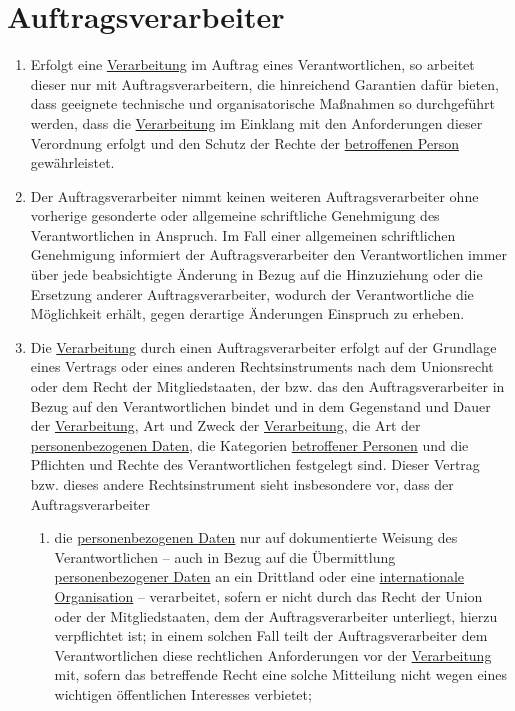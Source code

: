 \chapter{Auftragsverarbeiter}
\label{ch:28}


\begin{enumerate}

  \item Erfolgt eine \hyperref[itm:04-2]{Verarbeitung} im Auftrag eines Verantwortlichen, so arbeitet dieser nur mit Auftragsverarbeitern,
   die hinreichend Garantien dafür bieten, dass geeignete technische und organisatorische Maßnahmen so durchgeführt
   werden, dass die \hyperref[itm:04-2]{Verarbeitung} im Einklang mit den Anforderungen dieser Verordnung erfolgt und den Schutz der Rechte
   der \hyperref[itm:04-1]{betroffenen Person} gewährleistet.
  \label{itm:28-1}

  \item Der Auftragsverarbeiter nimmt keinen weiteren Auftragsverarbeiter ohne vorherige gesonderte oder allgemeine
   schriftliche Genehmigung des Verantwortlichen in Anspruch. Im Fall einer allgemeinen schriftlichen Genehmigung
   informiert der Auftragsverarbeiter den Verantwortlichen immer über jede beabsichtigte Änderung in Bezug auf die
   Hinzuziehung oder die Ersetzung anderer Auftragsverarbeiter, wodurch der Verantwortliche die Möglichkeit erhält,
   gegen derartige Änderungen Einspruch zu erheben.
  \label{itm:28-2}

  \item Die \hyperref[itm:04-2]{Verarbeitung} durch einen Auftragsverarbeiter erfolgt auf der Grundlage eines Vertrags oder eines anderen
   Rechtsinstruments nach dem Unionsrecht oder dem Recht der Mitgliedstaaten, der bzw. das den Auftragsverarbeiter in
   Bezug auf den Verantwortlichen bindet und in dem Gegenstand und Dauer der \hyperref[itm:04-2]{Verarbeitung}, Art und Zweck der
   \hyperref[itm:04-2]{Verarbeitung}, die Art der \hyperref[itm:04-1]{personenbezogenen Daten}, die Kategorien \hyperref[itm:04-1]{betroffener Personen} und die Pflichten und Rechte
   des Verantwortlichen festgelegt sind. Dieser Vertrag bzw. dieses andere Rechtsinstrument sieht insbesondere vor,
   dass der Auftragsverarbeiter
  \label{itm:28-3-1}

  \begin{enumerate}
  
    \item die \hyperref[itm:04-1]{personenbezogenen Daten} nur auf dokumentierte Weisung des Verantwortlichen -- auch in Bezug auf die
     Übermittlung \hyperref[itm:04-1]{personenbezogener Daten} an ein Drittland oder eine \hyperref[itm:04-29]{internationale Organisation} -- verarbeitet, sofern
     er nicht durch das Recht der Union oder der Mitgliedstaaten, dem der Auftragsverarbeiter unterliegt, hierzu
     verpflichtet ist; in einem solchen Fall teilt der Auftragsverarbeiter dem Verantwortlichen diese rechtlichen
     Anforderungen vor der \hyperref[itm:04-2]{Verarbeitung} mit, sofern das betreffende Recht eine solche Mitteilung nicht wegen eines
     wichtigen öffentlichen Interesses verbietet;
    \label{itm:28-3-1a}


\end{enumerate}
\end{enumerate}

